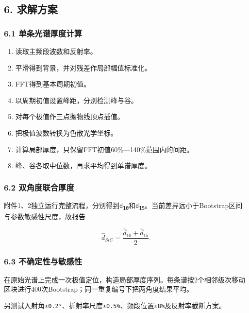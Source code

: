 \documentclass[11pt,a4paper]{ctexart}
\begin{document}
\subsection*{6. 求解方案}
\subsubsection*{6.1 单条光谱厚度计算}
\begin{enumerate}
\item 读取主频段波数和反射率。
\item 平滑得到背景，并对残差作局部幅值标准化。
\item FFT得到基本周期初值。
\item 以周期初值设置峰距，分别检测峰与谷。
\item 对每个极值作三点抛物线顶点插值。
\item 把极值波数转换为色散光学坐标。
\item 计算局部厚度，只保留FFT初值60\%—140\%范围内的间距。
\item 峰、谷各取中位数，再求平均得到单谱厚度。
\end{enumerate}
\subsubsection*{6.2 双角度联合厚度}
附件1、2独立运行完整流程，分别得到\texttt{d\textsubscript{1}\textsubscript{0}}和\texttt{d\textsubscript{1}\textsubscript{5}}。当前差异远小于Bootstrap区间与参数敏感性尺度，故报告


\[
\hat d_{SiC}=\frac{\hat d_{10}+\hat d_{15}}{2}.
\]
\subsubsection*{6.3 不确定性与敏感性}
在原始光谱上完成一次极值定位，构造局部厚度序列。每条谱按2个相邻级次移动区块进行400次Bootstrap；同一重复编号下把两角度结果平均。


另测试入射角\texttt{±0.2°}、折射率尺度\texttt{±0.5\%}、频段位置\texttt{±8\%}及反射率截断方案。
\end{document}
